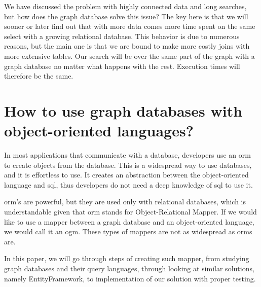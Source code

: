 We have discussed the problem with highly connected data and long searches, but how does the graph database solve this issue? The key here is that we will sooner or later find out that with more data comes more time spent on the same select with a growing relational database. This behavior is due to numerous reasons, but the main one is that we are bound to make more costly joins with more extensive tables. Our search will be over the same part of the graph with a graph database no matter what happens with the rest. Execution times will therefore be the same.

\section{How to use graph databases with object-oriented languages?}

In most applications that communicate with a database, developers use an \acrshort{orm} to create objects from the database.
This is a widespread way to use databases, and it is effortless to use. It creates an abstraction between the object-oriented language and \acrshort{sql}, thus developers
do not need a deep knowledge of \acrshort{sql} to use it.

\acrshort{orm}'s are powerful, but they are used only with relational databases, which is understandable given that \acrshort{orm} stands for Object-Relational Mapper.
If we would like to use a mapper between a graph database and an object-oriented language, we would call it an \acrfull{ogm}. These types of mappers are not
as widespread as \acrshort{orm}s are.

In this paper, we will go through steps of creating such mapper, from studying graph databases and their query languages, through looking at similar solutions, namely EntityFramework,
to implementation of our solution with proper testing.
